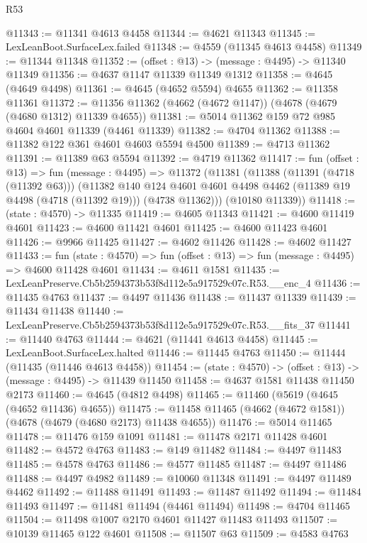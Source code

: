 \begin{lexlean}{R53}
\begin{coremodule}
@11343 := @11341 @4613 @4458
@11344 := @4621 @11343
@11345 := LexLeanBoot.SurfaceLex.failed
@11348 := @4559 (@11345 @4613 @4458)
@11349 := @11344 @11348
@11352 := (offset : @13) -> (message : @4495) -> @11340 @11349
@11356 := @4637 @1147 @11339 @11349 @1312
@11358 := @4645 (@4649 @4498)
@11361 := @4645 (@4652 @5594) @4655
@11362 := @11358 @11361
@11372 := @11356 @11362 (@4662 (@4672 @1147)) (@4678 (@4679 (@4680 @1312) @11339 @4655))
@11381 := @5014 @11362 @159 @72 @985 @4604 @4601 @11339 (@4461 @11339)
@11382 := @4704 @11362
@11388 := @11382 @122 @361 @4601 @4603 @5594 @4500
@11389 := @4713 @11362
@11391 := @11389 @63 @5594
@11392 := @4719 @11362
@11417 := fun (offset : @13) =>
  fun (message : @4495) =>
  @11372
    (@11381
      (@11388
        (@11391 (@4718 (@11392 @63)))
        (@11382
          @140
          @124
          @4601
          @4601
          @4498
          @4462
          (@11389 @19 @4498 (@4718 (@11392 @19)))
          (@4738 @11362)))
      (@10180 @11339))
@11418 := (state : @4570) -> @11335
@11419 := @4605 @11343
@11421 := @4600 @11419 @4601
@11423 := @4600 @11421 @4601
@11425 := @4600 @11423 @4601
@11426 := @9966 @11425
@11427 := @4602 @11426
@11428 := @4602 @11427
@11433 := fun (state : @4570) => fun (offset : @13) => fun (message : @4495) => @4600 @11428 @4601
@11434 := @4611 @1581
@11435 := LexLeanPreserve.Cb5b2594373b53f8d112e5a917529c07c.R53.__enc_4
@11436 := @11435 @4763
@11437 := @4497 @11436
@11438 := @11437 @11339
@11439 := @11434 @11438
@11440 := LexLeanPreserve.Cb5b2594373b53f8d112e5a917529c07c.R53.__fits_37
@11441 := @11440 @4763
@11444 := @4621 (@11441 @4613 @4458)
@11445 := LexLeanBoot.SurfaceLex.halted
@11446 := @11445 @4763
@11450 := @11444 (@11435 (@11446 @4613 @4458))
@11454 := (state : @4570) -> (offset : @13) -> (message : @4495) -> @11439 @11450
@11458 := @4637 @1581 @11438 @11450 @2173
@11460 := @4645 (@4812 @4498)
@11465 := @11460 (@5619 (@4645 (@4652 @11436) @4655))
@11475 := @11458 @11465 (@4662 (@4672 @1581)) (@4678 (@4679 (@4680 @2173) @11438 @4655))
@11476 := @5014 @11465
@11478 := @11476 @159 @1091
@11481 := @11478 @2171 @11428 @4601
@11482 := @4572 @4763
@11483 := @149 @11482
@11484 := @4497 @11483
@11485 := @4578 @4763
@11486 := @4577 @11485
@11487 := @4497 @11486
@11488 := @4497 @4982
@11489 := @10060 @11348
@11491 := @4497 @11489 @4462
@11492 := @11488 @11491
@11493 := @11487 @11492
@11494 := @11484 @11493
@11497 := @11481 @11494 (@4461 @11494)
@11498 := @4704 @11465
@11504 := @11498 @1007 @2170 @4601 @11427 @11483 @11493
@11507 := @10139 @11465 @122 @4601
@11508 := @11507 @63
@11509 := @4583 @4763

\end{coremodule}
\end{lexlean}
